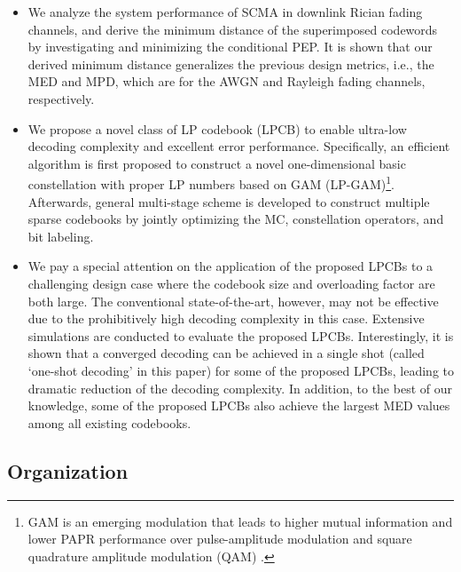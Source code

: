 \documentclass[journal]{IEEEtran}
\begin{document}
\begin{itemize}
  \item 
  We analyze  the  system performance of SCMA in downlink Rician fading channels, and  derive the minimum distance of the  superimposed  codewords   by investigating  and minimizing the conditional  PEP. It is shown that our   derived minimum distance  generalizes  the previous design metrics, i.e., the MED and MPD, which are for the AWGN and Rayleigh fading channels, respectively.
 
  
  \item We propose a novel class of LP codebook (LPCB) to   enable  ultra-low   decoding complexity  and   excellent   error
performance.  Specifically, an efficient algorithm  is first proposed to  construct a novel  one-dimensional basic constellation with  proper LP numbers based on GAM  (LP-GAM)\footnote{GAM is an emerging  modulation that  leads to higher  mutual information and lower  PAPR performance over pulse-amplitude modulation   and square quadrature amplitude modulation (QAM) \cite{larsson2017golden}.}.  Afterwards, general multi-stage  scheme is developed to construct multiple sparse codebooks by jointly optimizing the MC, constellation operators, and bit labeling.  
 
 

\item  We pay a special attention on the application of the proposed LPCBs to a challenging design case where the codebook size and overloading factor are both large. The conventional state-of-the-art, however, may not be effective due to the prohibitively high decoding complexity in this case.   Extensive simulations are   conducted to evaluate the proposed LPCBs. Interestingly, it is shown that a converged   decoding can be achieved in a single shot (called 
`one-shot decoding' in this paper) for some of the proposed LPCBs, leading to dramatic reduction of the decoding complexity.  In addition, to the best of our    knowledge, some of the proposed LPCBs also achieve the largest MED values among all existing codebooks.
\end{itemize}

 \subsection{Organization}
\end{document}
